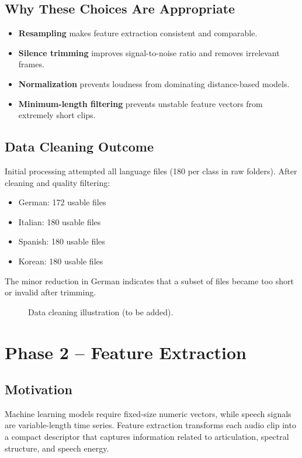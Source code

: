 \documentclass[a4paper,14pt]{extarticle}
\begin{document}
\subsection{Why These Choices Are Appropriate}
\begin{itemize}
    \item \textbf{Resampling} makes feature extraction consistent and comparable.
    \item \textbf{Silence trimming} improves signal-to-noise ratio and removes irrelevant frames.
    \item \textbf{Normalization} prevents loudness from dominating distance-based models.
    \item \textbf{Minimum-length filtering} prevents unstable feature vectors from extremely short clips.
\end{itemize}

\subsection{Data Cleaning Outcome}
Initial processing attempted all language files (180 per class in raw folders). After cleaning and quality filtering:
\begin{itemize}
    \item German: 172 usable files
    \item Italian: 180 usable files
    \item Spanish: 180 usable files
    \item Korean: 180 usable files
\end{itemize}
The minor reduction in German indicates that a subset of files became too short or invalid after trimming.

\begin{figure}[h]
    \centering
    \caption{Data cleaning illustration (to be added).}
    \label{fig:data_cleaning_placeholder}
\end{figure}

\newpage
\section{Phase 2 -- Feature Extraction}

\subsection{Motivation}
Machine learning models require fixed-size numeric vectors, while speech signals are variable-length time series. Feature extraction transforms each audio clip into a compact descriptor that captures information related to articulation, spectral structure, and speech energy.
\end{document}
